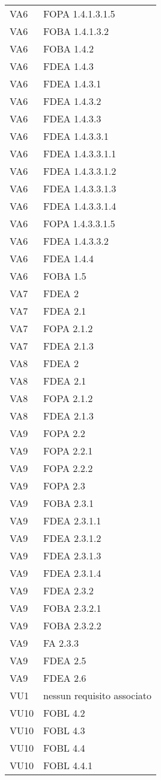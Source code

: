 \begin{longtable}{XX}
VA6&FOPA 1.4.1.3.1.5\\ 
VA6&FOBA 1.4.1.3.2\\ 
VA6&FOBA 1.4.2\\ 
VA6&FDEA 1.4.3\\ 
VA6&FDEA 1.4.3.1\\ 
VA6&FDEA 1.4.3.2\\ 
VA6&FDEA 1.4.3.3\\ 
VA6&FDEA 1.4.3.3.1\\ 
VA6&FDEA 1.4.3.3.1.1\\ 
VA6&FDEA 1.4.3.3.1.2\\ 
VA6&FDEA 1.4.3.3.1.3\\ 
VA6&FDEA 1.4.3.3.1.4\\ 
VA6&FOPA 1.4.3.3.1.5\\ 
VA6&FDEA 1.4.3.3.2\\ 
VA6&FDEA 1.4.4\\ 
VA6&FOBA 1.5\\ 
\midrule 
VA7&FDEA 2\\ 
VA7&FDEA 2.1\\ 
VA7&FOPA 2.1.2\\ 
VA7&FDEA 2.1.3\\ 
\midrule 
VA8&FDEA 2\\ 
VA8&FDEA 2.1\\ 
VA8&FOPA 2.1.2\\ 
VA8&FDEA 2.1.3\\ 
\midrule 
VA9&FOPA 2.2\\ 
VA9&FOPA 2.2.1\\ 
VA9&FOPA 2.2.2\\ 
VA9&FOPA 2.3\\ 
VA9&FOBA 2.3.1\\ 
VA9&FDEA 2.3.1.1\\ 
VA9&FDEA 2.3.1.2\\ 
VA9&FDEA 2.3.1.3\\ 
VA9&FDEA 2.3.1.4\\ 
VA9&FDEA 2.3.2\\ 
VA9&FOBA 2.3.2.1\\ 
VA9&FOBA 2.3.2.2\\ 
VA9&FA 2.3.3\\ 
VA9&FDEA 2.5\\ 
VA9&FDEA 2.6\\ 
\midrule 
VU1&nessun requisito associato\\ 
\midrule 
VU10&FOBL 4.2\\ 
VU10&FOBL 4.3\\ 
VU10&FOBL 4.4\\ 
VU10&FOBL 4.4.1\\ 

\end{longtable}
